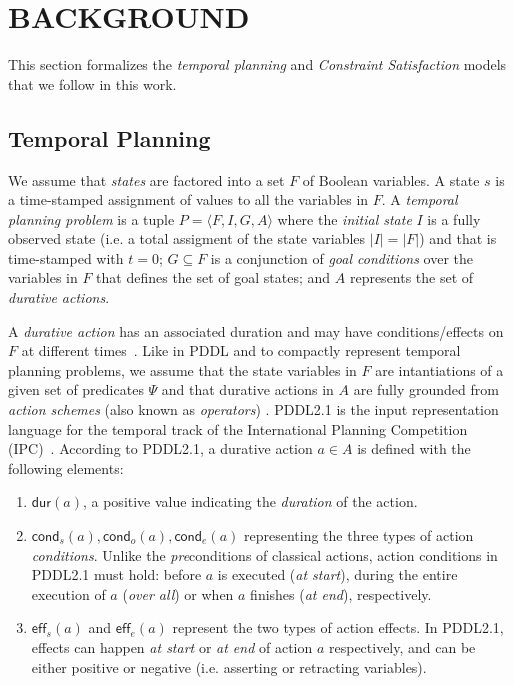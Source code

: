 \documentclass{ecai}
\newcommand{\tup}[1]{{\langle #1 \rangle}}
\newcommand{\eff}{\mathsf{eff}}    %
\newcommand{\cond}{\mathsf{cond}}  %
\newcommand{\dur}{\mathsf{dur}}    %
\begin{document}
\section{BACKGROUND}

This section formalizes the {\em temporal planning} and {\em Constraint Satisfaction} models that we follow in this work.

\subsection{Temporal Planning}
\label{sec:temporalplanning}

We assume that {\em states} are factored into a set $F$ of Boolean variables. A state $s$ is a time-stamped assignment of values to all the variables in $F$. A {\em temporal planning problem} is a tuple $P=\tup{F,I,G,A}$ where the {\em initial state} $I$ is a fully observed state (i.e. a total assigment of the state variables $|I|=|F|$) and that is time-stamped with $t=0$; $G \subseteq F$ is a conjunction of {\em goal conditions} over the variables in $F$ that defines the set of goal states; and $A$ represents the set of {\em durative actions}.

A {\em durative action} has an associated duration and may have conditions/effects on $F$ at different times~\cite{garrido2009constraint,vidal2006branching}. Like in PDDL and to compactly represent temporal planning problems, we assume that the state variables in $F$ are intantiations of a given set of predicates $\Psi$ and that durative actions in $A$ are fully grounded from {\em action schemes} (also known as {\em operators}) .  PDDL2.1 is the input representation language for the temporal track of the International Planning Competition (IPC)~\cite{fox2003pddl2,ghallab2004automated}. According to PDDL2.1, a durative action $a\in A$ is defined with the following elements:

\begin{enumerate}
\item $\dur(a)$, a positive value indicating the {\em duration} of the action.

\item $\cond_s(a), \cond_o(a), \cond_e(a)$ representing the three types of action {\em conditions}. Unlike the \emph{pre}conditions of classical actions, action conditions in PDDL2.1 must hold: before $a$ is executed ({\em at start}), during the entire execution of $a$ ({\em over all}) or when $a$ finishes ({\em at end}), respectively. 

\item $\eff_s(a)$ and $\eff_e(a)$ represent the two types of action effects. In PDDL2.1, effects can happen {\em at start} or {\em at end} of action $a$ respectively, and can be either positive or negative (i.e. asserting or retracting variables). 

\end{enumerate}
\end{document}

